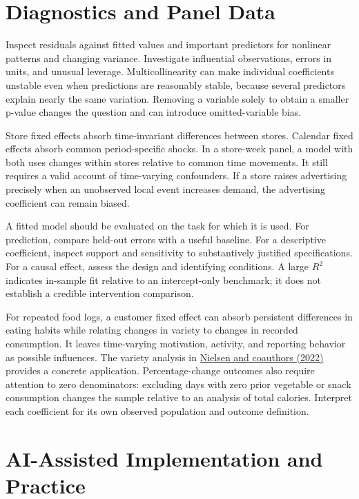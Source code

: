 \hypertarget{M03-diagnostics-and-panel-data}{%
\section{Diagnostics and Panel
Data}\label{M03-diagnostics-and-panel-data}}

\noindent Inspect residuals against fitted values and important predictors for
nonlinear patterns and changing variance. Investigate influential
observations, errors in units, and unusual leverage. Multicollinearity
can make individual coefficients unstable even when predictions are
reasonably stable, because several predictors explain nearly the same
variation. Removing a variable solely to obtain a smaller p-value
changes the question and can introduce omitted-variable bias.

Store fixed effects absorb time-invariant differences between stores.
Calendar fixed effects absorb common period-specific shocks. In a
store-week panel, a model with both uses changes within stores relative
to common time movements. It still requires a valid account of
time-varying confounders. If a store raises advertising precisely when
an unobserved local event increases demand, the advertising coefficient
can remain biased.

A fitted model should be evaluated on the task for which it is used. For
prediction, compare held-out errors with a useful baseline. For a
descriptive coefficient, inspect support and sensitivity to
substantively justified specifications. For a causal effect, assess the
design and identifying conditions. A large \(R^2\) indicates in-sample
fit relative to an intercept-only benchmark; it does not establish a
credible intervention comparison.

For repeated food logs, a customer fixed effect can absorb persistent
differences in eating habits while relating changes in variety to
changes in recorded consumption. It leaves time-varying motivation,
activity, and reporting behavior as possible influences. The variety
analysis in \href{https://doi.org/10.1086/720453}{Nielsen and coauthors
(2022)} provides a concrete application. Percentage-change outcomes also
require attention to zero denominators: excluding days with zero prior
vegetable or snack consumption changes the sample relative to an
analysis of total calories. Interpret each coefficient for its own
observed population and outcome definition.

\hypertarget{M03-ai-assisted-implementation-and-practice}{%
\section{AI-Assisted Implementation and
Practice}\label{M03-ai-assisted-implementation-and-practice}}

